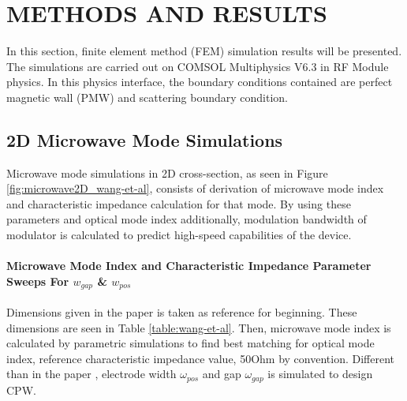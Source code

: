 \chapter{METHODS AND RESULTS}

    In this section, finite element method (FEM) simulation results will be presented. The simulations are carried out on COMSOL Multiphysics V6.3 in RF Module physics. In this physics interface, the boundary conditions contained are perfect magnetic wall (PMW) and scattering boundary condition.
    
	\section{2D Microwave Mode Simulations}    
    
	Microwave mode simulations in 2D cross-section, as seen in Figure \ref{fig:microwave2D_wang-et-al}, consists of derivation of microwave mode index and characteristic impedance calculation for that mode. By using these parameters and optical mode index additionally, modulation bandwidth of modulator is calculated to predict high-speed capabilities of the device.
    
    \subsubsection{Microwave Mode Index  and Characteristic Impedance Parameter Sweeps For $w_{gap}$ \& $w_{pos}$}
    
    Dimensions given in the paper \cite{14} is taken as reference for beginning. These dimensions are seen in Table \ref{table:wang-et-al}. Then, microwave mode index is calculated by parametric simulations to find best matching for optical mode index, reference characteristic impedance value, 50Ohm by convention. Different than in the paper \cite{14}, electrode width $\omega _{pos}$ and gap $\omega _{gap}$ is simulated to design CPW.
    
